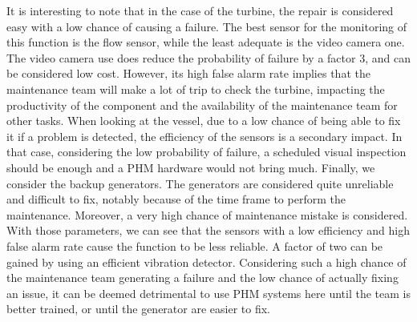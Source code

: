 It is interesting to note that in the case of the turbine, the repair is considered easy with a low chance of causing a failure. The best sensor for the monitoring of this function is the flow sensor, while the least adequate is the video camera one. The video camera use does reduce the probability of failure by a factor 3, and can be considered low cost. However, its high false alarm rate implies that the maintenance team will make a lot of trip to check the turbine, impacting the productivity of the component and the availability of the maintenance team for other tasks. When looking at the vessel, due to a low chance of being able to fix it if a problem is detected, the efficiency of the sensors is a secondary impact. In that case, considering the low probability of failure, a scheduled visual inspection should be enough and a PHM hardware would not bring much. Finally, we consider the backup generators. The generators are considered quite unreliable and difficult to fix, notably because of the time frame to perform the maintenance. Moreover, a very high chance of maintenance mistake is considered. With those parameters, we can see that the sensors with a low efficiency and high false alarm rate cause the function to be less reliable. A factor of two can be gained by using an efficient vibration detector. Considering such a high chance of the maintenance team generating a failure and the low chance of actually fixing an issue, it can be deemed detrimental to use PHM systems here until the team is better trained, or until the generator are easier to fix.

